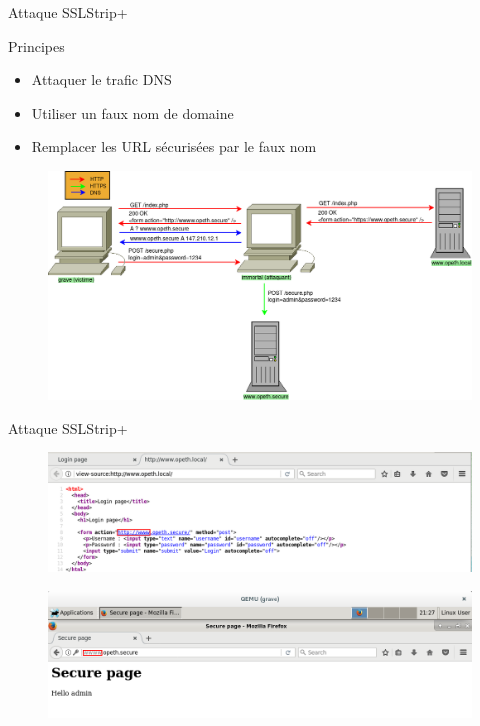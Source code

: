 \begin{frame}[fragile]{Attaque SSLStrip+}
  \begin{block}{Principes}
    \begin{itemize}
    \item{Attaquer le trafic DNS}
    \item{Utiliser un faux nom de domaine}
    \item{Remplacer les URL sécurisées par le faux nom}
    \end{itemize}
  \end{block}

  \begin{figure}
    \includegraphics[width=0.86\linewidth]{../medias/sslstrip2/attack.png}
  \end{figure}
\end{frame}

\begin{frame}{Attaque SSLStrip+}
  \begin{figure}
    \includegraphics[width=1.0\linewidth]{../medias/sslstrip2/screen5-2.png}
  \end{figure}

  \begin{figure}
    \includegraphics[width=1.0\linewidth]{../medias/sslstrip2/screen6.png}
  \end{figure}

\end{frame}
